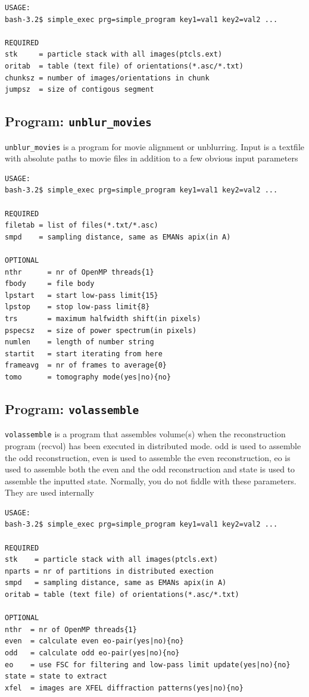 \documentclass[a4paper,11pt]{article}
\newcommand{\prgname}[1]{\textcolor{NavyBlue}{\texttt{#1}}}
\begin{document}
\begin{verbatim}
USAGE:
bash-3.2$ simple_exec prg=simple_program key1=val1 key2=val2 ...

REQUIRED
stk     = particle stack with all images(ptcls.ext)
oritab  = table (text file) of orientations(*.asc/*.txt)
chunksz = number of images/orientations in chunk
jumpsz  = size of contigous segment
\end{verbatim}

\subsection{Program: \prgname{unblur\_movies}}
\label{unblur_movies}
\prgname{unblur\_movies} is a program for movie alignment or unblurring. Input is a textfile with absolute paths to movie files in addition to a few obvious input parameters

\begin{verbatim}
USAGE:
bash-3.2$ simple_exec prg=simple_program key1=val1 key2=val2 ...

REQUIRED
filetab = list of files(*.txt/*.asc)
smpd    = sampling distance, same as EMANs apix(in A)

OPTIONAL
nthr      = nr of OpenMP threads{1}
fbody     = file body
lpstart   = start low-pass limit{15}
lpstop    = stop low-pass limit{8}
trs       = maximum halfwidth shift(in pixels)
pspecsz   = size of power spectrum(in pixels)
numlen    = length of number string
startit   = start iterating from here
frameavg  = nr of frames to average{0}
tomo      = tomography mode(yes|no){no}
\end{verbatim}

\subsection{Program: \prgname{volassemble}}
\label{volassemble}
\prgname{volassemble} is a program that assembles volume(s) when the reconstruction program (recvol) has been executed in distributed mode. odd is used to assemble the odd reconstruction, even is used to assemble the even reconstruction, eo is used to assemble both the even and the odd reconstruction and state is used to assemble the inputted state. Normally, you do not fiddle with these parameters. They are used internally

\begin{verbatim}
USAGE:
bash-3.2$ simple_exec prg=simple_program key1=val1 key2=val2 ...

REQUIRED
stk    = particle stack with all images(ptcls.ext)
nparts = nr of partitions in distributed exection
smpd   = sampling distance, same as EMANs apix(in A)
oritab = table (text file) of orientations(*.asc/*.txt)

OPTIONAL
nthr  = nr of OpenMP threads{1}
even  = calculate even eo-pair(yes|no){no}
odd   = calculate odd eo-pair(yes|no){no}
eo    = use FSC for filtering and low-pass limit update(yes|no){no}
state = state to extract
xfel  = images are XFEL diffraction patterns(yes|no){no}
\end{verbatim}
\end{document}
